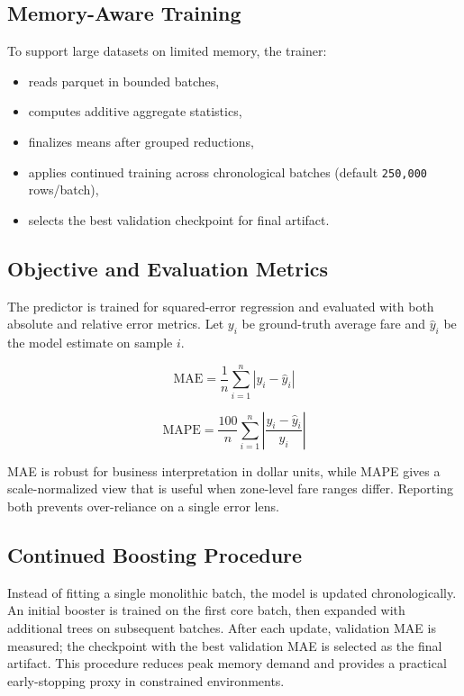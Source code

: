 \documentclass[conference]{IEEEtran}
\begin{document}
\subsection{Memory-Aware Training}
To support large datasets on limited memory, the trainer:
\begin{itemize}[leftmargin=1.5em]
    \item reads parquet in bounded batches,
    \item computes additive aggregate statistics,
    \item finalizes means after grouped reductions,
    \item applies continued training across chronological batches (default \texttt{250,000} rows/batch),
    \item selects the best validation checkpoint for final artifact.
\end{itemize}

\subsection{Objective and Evaluation Metrics}
The predictor is trained for squared-error regression and evaluated with both absolute and relative error metrics. Let $y_i$ be ground-truth average fare and $\hat{y}_i$ be the model estimate on sample $i$.

\begin{equation}
\mathrm{MAE}=\frac{1}{n}\sum_{i=1}^{n}|y_i-\hat{y}_i|
\end{equation}

\begin{equation}
\mathrm{MAPE}=\frac{100}{n}\sum_{i=1}^{n}\left|\frac{y_i-\hat{y}_i}{y_i}\right|
\end{equation}

MAE is robust for business interpretation in dollar units, while MAPE gives a scale-normalized view that is useful when zone-level fare ranges differ. Reporting both prevents over-reliance on a single error lens.

\subsection{Continued Boosting Procedure}
Instead of fitting a single monolithic batch, the model is updated chronologically. An initial booster is trained on the first core batch, then expanded with additional trees on subsequent batches. After each update, validation MAE is measured; the checkpoint with the best validation MAE is selected as the final artifact. This procedure reduces peak memory demand and provides a practical early-stopping proxy in constrained environments.
\end{document}
